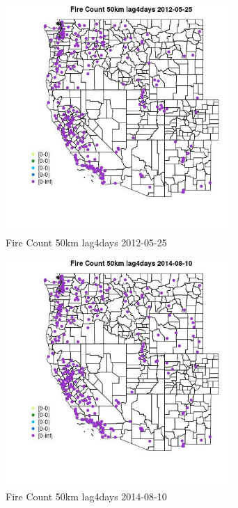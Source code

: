 \begin{figure} 
\centering  
\includegraphics[width=0.77\textwidth]{Code_Outputs/Report_ML_input_PM25_Step4_part_e_de_duplicated_aves_compiled_2019-05-18wNAs_MapObsFire_Count_50km_lag4days2012-05-25.jpg} 
\caption{\label{fig:Report_ML_input_PM25_Step4_part_e_de_duplicated_aves_compiled_2019-05-18wNAsMapObsFire_Count_50km_lag4days2012-05-25}Fire Count 50km lag4days 2012-05-25} 
\end{figure} 
 

\clearpage 

\begin{figure} 
\centering  
\includegraphics[width=0.77\textwidth]{Code_Outputs/Report_ML_input_PM25_Step4_part_e_de_duplicated_aves_compiled_2019-05-18wNAs_MapObsFire_Count_50km_lag4days2014-08-10.jpg} 
\caption{\label{fig:Report_ML_input_PM25_Step4_part_e_de_duplicated_aves_compiled_2019-05-18wNAsMapObsFire_Count_50km_lag4days2014-08-10}Fire Count 50km lag4days 2014-08-10} 
\end{figure} 
 

